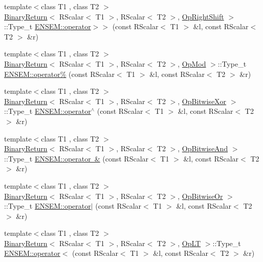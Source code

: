 \begin{DoxyCompactItemize}
\item 
{\footnotesize template$<$class T1 , class T2 $>$ }\\\mbox{\hyperlink{structBinaryReturn}{Binary\+Return}}$<$ R\+Scalar$<$ T1 $>$, R\+Scalar$<$ T2 $>$, \mbox{\hyperlink{structOpRightShift}{Op\+Right\+Shift}} $>$\+::Type\+\_\+t \mbox{\hyperlink{group__rscalar_ga2b0d653b11b094308672a6a37a90d2c3}{E\+N\+S\+E\+M\+::operator$>$$>$}} (const R\+Scalar$<$ T1 $>$ \&l, const R\+Scalar$<$ T2 $>$ \&r)
\item 
{\footnotesize template$<$class T1 , class T2 $>$ }\\\mbox{\hyperlink{structBinaryReturn}{Binary\+Return}}$<$ R\+Scalar$<$ T1 $>$, R\+Scalar$<$ T2 $>$, \mbox{\hyperlink{structOpMod}{Op\+Mod}} $>$\+::Type\+\_\+t \mbox{\hyperlink{group__rscalar_ga98c5cade5781b5cdc4cbb1bb1d52739c}{E\+N\+S\+E\+M\+::operator\%}} (const R\+Scalar$<$ T1 $>$ \&l, const R\+Scalar$<$ T2 $>$ \&r)
\item 
{\footnotesize template$<$class T1 , class T2 $>$ }\\\mbox{\hyperlink{structBinaryReturn}{Binary\+Return}}$<$ R\+Scalar$<$ T1 $>$, R\+Scalar$<$ T2 $>$, \mbox{\hyperlink{structOpBitwiseXor}{Op\+Bitwise\+Xor}} $>$\+::Type\+\_\+t \mbox{\hyperlink{group__rscalar_gaded7a3a7e06c5438511a12e861cbd165}{E\+N\+S\+E\+M\+::operator$^\wedge$}} (const R\+Scalar$<$ T1 $>$ \&l, const R\+Scalar$<$ T2 $>$ \&r)
\item 
{\footnotesize template$<$class T1 , class T2 $>$ }\\\mbox{\hyperlink{structBinaryReturn}{Binary\+Return}}$<$ R\+Scalar$<$ T1 $>$, R\+Scalar$<$ T2 $>$, \mbox{\hyperlink{structOpBitwiseAnd}{Op\+Bitwise\+And}} $>$\+::Type\+\_\+t \mbox{\hyperlink{group__rscalar_ga389f96c37c3b933acfc68be93291ae0e}{E\+N\+S\+E\+M\+::operator \&}} (const R\+Scalar$<$ T1 $>$ \&l, const R\+Scalar$<$ T2 $>$ \&r)
\item 
{\footnotesize template$<$class T1 , class T2 $>$ }\\\mbox{\hyperlink{structBinaryReturn}{Binary\+Return}}$<$ R\+Scalar$<$ T1 $>$, R\+Scalar$<$ T2 $>$, \mbox{\hyperlink{structOpBitwiseOr}{Op\+Bitwise\+Or}} $>$\+::Type\+\_\+t \mbox{\hyperlink{group__rscalar_ga9e5397786fb0d112594a1fb887b1a58d}{E\+N\+S\+E\+M\+::operator$\vert$}} (const R\+Scalar$<$ T1 $>$ \&l, const R\+Scalar$<$ T2 $>$ \&r)
\item 
{\footnotesize template$<$class T1 , class T2 $>$ }\\\mbox{\hyperlink{structBinaryReturn}{Binary\+Return}}$<$ R\+Scalar$<$ T1 $>$, R\+Scalar$<$ T2 $>$, \mbox{\hyperlink{structOpLT}{Op\+LT}} $>$\+::Type\+\_\+t \mbox{\hyperlink{group__rscalar_gaa8cbddeaf30b9bc34c8cca497a259805}{E\+N\+S\+E\+M\+::operator$<$}} (const R\+Scalar$<$ T1 $>$ \&l, const R\+Scalar$<$ T2 $>$ \&r)

\end{DoxyCompactItemize}
